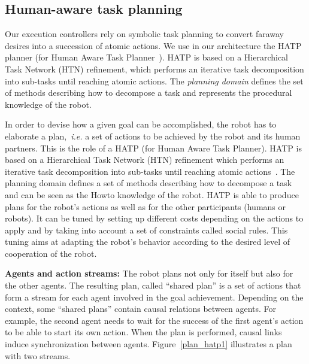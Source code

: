 \documentclass[preprint,12pt]{elsarticle}
\begin{document}

\subsection{Human-aware task planning}

Our execution controllers rely on symbolic task planning to convert faraway
desires into a succession of atomic actions. We use in our architecture the
HATP planner (for Human Aware Task Planner~\cite{Alili2009}).  HATP is based on
a Hierarchical Task Network (HTN) refinement, which performs an iterative task
decomposition into sub-tasks until reaching atomic actions. The \emph{planning
domain} defines the set of methods describing how to decompose a task and
represents the procedural knowledge of the robot.

In order to devise how a given goal can be accomplished, the robot has
to elaborate a plan,~\textit{i.e.} a set of actions to be achieved by
the robot and its human partners.  This is the role of a HATP
\cite{Alili2008} (for Human Aware Task Planner).  HATP is based on a
Hierarchical Task Network (HTN) refinement which performs an iterative
task decomposition into sub-tasks until reaching atomic
actions~\cite{Nau2003}.  The planning domain defines a set of methods
describing how to decompose a task and can be seen as the Howto
knowledge of the robot.  HATP is able to produce plans for the robot's
actions as well as for the other participants (humans or robots). It
can be tuned by setting up different costs depending on the actions to
apply and by taking into account a set of constraints called social
rules. This tuning aims at adapting the robot's behavior according to
the desired level of cooperation of the robot.

\vspace{0.3cm}
\noindent
\textbf{Agents and action streams:}
The robot plans not only for itself but also for the other agents. The
resulting plan, called ``shared plan'' is a set of actions that form
a stream for each agent involved in the goal achievement. Depending on
the context, some ``shared plans'' contain causal relations between
agents. For example, the second agent needs to wait for the success of
the first agent's action to be able to start its own action. When the
plan is performed, causal links induce synchronization between
agents. Figure~\ref{plan_hatp1} illustrates a plan with two streams.
\end{document}

